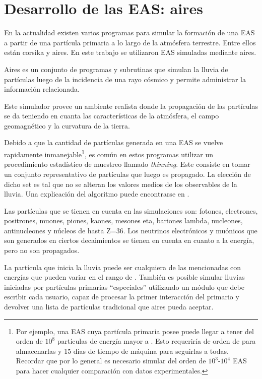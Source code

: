 	\section{Desarrollo de las EAS: {\sc aires}}

	En la actualidad existen varios programas para simular la formación de una EAS a partir de una partícula primaria a lo largo de la atmósfera terrestre.
	Entre ellos están {\sc corsika} y {\sc aires}.
	En este trabajo se utilizaron EAS simuladas mediante {\sc aires}.

	{\sc Aires} es un conjunto de programas y subrutinas que simulan la lluvia de partículas luego de la incidencia de una rayo cósmico y permite administrar la información relacionada. 

	Este simulador provee un ambiente realista donde la propagación de las partículas se da teniendo en cuanta las características de la atmósfera, el campo geomagnético y la curvatura de la tierra. 
	
	Debido a que la cantidad de part\'iculas generada en una EAS se vuelve rapidamente inmanejable\footnote{Por ejemplo, una EAS cuya part\'icula primaria posee  puede llegar a tener del orden de $10^8$ part\'iculas de energ\'ia mayor a . Esto requerir\'ia de orden de  para almacenarlas y 15 d\'ias de tiempo de m\'aquina para seguirlas a todas. Recordar que por lo general es necesario simular del orden de $10^3\textit{-}10^4$ EAS para hacer cualquier comparaci\'on con datos experimentales.}, es com\'un en estos programas utilizar un procedimiento estadístico de muestreo llamado {\em thinning}.
	Este consiste en tomar un conjunto representativo de part\'iculas que luego es propagado.
	La elecci\'on de dicho set es tal que no se alteran los valores medios de los observables de la lluvia.
	Una explicaci\'on del algoritmo puede encontrarse en \cite{thining}.

	Las partículas que se tienen en cuenta en las simulaciones son: fotones, electrones, positrones, muones, piones, kaones, mesones eta, bariones lambda, nucleones, antinucleones y núcleos de hasta Z=36.
	Los neutrinos electr\'onicos y mu\'onicos que son generados en ciertos decaimientos se tienen en cuenta en cuanto a la energía, pero no son propagados.
	
	La part\'icula que inicia la lluvia puede ser cualquiera de las mencionadas con energías que pueden variar en el rango de . 
	Tambi\'en es posible simular lluvias iniciadas por partículas primarias ``especiales'' utilizando un módulo que debe escribir cada usuario, capaz de procesar la primer interacción del primario y devolver una lista de part\'iculas tradicional que {\sc aires} pueda aceptar. 

